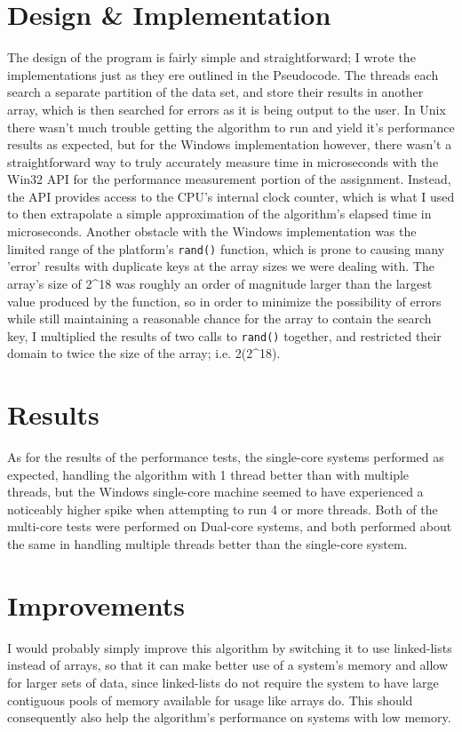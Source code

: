 \documentclass[12pt]{article}
\begin{document}
\section*{Design \& Implementation}
The design of the program is fairly simple and straightforward; I wrote the implementations just as they ere outlined in the Pseudocode.
The threads each search a separate partition of the data set, and store their results in another array, which is then searched for
errors as it is being output to the user. In Unix there wasn't much trouble getting the algorithm to run and yield it's performance 
results as expected, but for the Windows implementation however, there wasn't a straightforward way to truly accurately measure time in 
microseconds with the Win32 API for the performance measurement portion of the assignment. Instead, the API provides access to the CPU's 
internal clock counter, which is what I used to then extrapolate a simple approximation of the algorithm's elapsed time in microseconds.  
Another obstacle with the Windows implementation was the limited range of the platform's \texttt{rand()} function, which is prone to causing 
many 'error' results with duplicate keys at the array sizes we were dealing with. The array's size of 2^{18} was roughly an order of magnitude 
larger than the largest value produced by the  function, so in order to minimize the possibility of errors while still maintaining 
a reasonable chance for the array to contain the search key, I multiplied the results of two calls to \texttt{rand()} together, and restricted 
their domain to twice the size of the array; i.e. 2(2^{18}).


\section*{Results}
As for the results of the performance tests, the single-core systems performed as expected, handling the algorithm with 1 thread better than with multiple threads, but the Windows single-core machine seemed to have experienced a noticeably higher spike when attempting to run 4 or more threads. Both of the multi-core tests were performed on Dual-core systems, and both performed about the same in handling multiple threads better than the single-core system.


\section*{Improvements}
I would probably simply improve this algorithm by switching it to use linked-lists instead of arrays, so that it can make better use of a system's memory and allow for larger sets of data,
since linked-lists do not require the system to have large contiguous pools of memory available for usage like arrays do. This should consequently also help the algorithm's performance
on systems with low memory.
\end{document}
